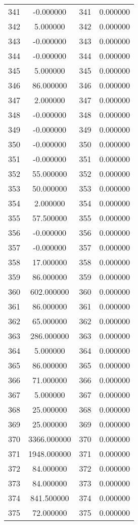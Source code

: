 \documentclass[12pt]{article}
\begin{document}
\begin{longtable}{@{}cccc@{}}
341 & -0.000000 & 341 & 0.000000 \\
342 & 5.000000 & 342 & 0.000000 \\
343 & -0.000000 & 343 & 0.000000 \\
344 & -0.000000 & 344 & 0.000000 \\
345 & 5.000000 & 345 & 0.000000 \\
346 & 86.000000 & 346 & 0.000000 \\
347 & 2.000000 & 347 & 0.000000 \\
348 & -0.000000 & 348 & 0.000000 \\
349 & -0.000000 & 349 & 0.000000 \\
350 & -0.000000 & 350 & 0.000000 \\
351 & -0.000000 & 351 & 0.000000 \\
352 & 55.000000 & 352 & 0.000000 \\
353 & 50.000000 & 353 & 0.000000 \\
354 & 2.000000 & 354 & 0.000000 \\
355 & 57.500000 & 355 & 0.000000 \\
356 & -0.000000 & 356 & 0.000000 \\
357 & -0.000000 & 357 & 0.000000 \\
358 & 17.000000 & 358 & 0.000000 \\
359 & 86.000000 & 359 & 0.000000 \\
360 & 602.000000 & 360 & 0.000000 \\
361 & 86.000000 & 361 & 0.000000 \\
362 & 65.000000 & 362 & 0.000000 \\
363 & 286.000000 & 363 & 0.000000 \\
364 & 5.000000 & 364 & 0.000000 \\
365 & 86.000000 & 365 & 0.000000 \\
366 & 71.000000 & 366 & 0.000000 \\
367 & 5.000000 & 367 & 0.000000 \\
368 & 25.000000 & 368 & 0.000000 \\
369 & 25.000000 & 369 & 0.000000 \\
370 & 3366.000000 & 370 & 0.000000 \\
371 & 1948.000000 & 371 & 0.000000 \\
372 & 84.000000 & 372 & 0.000000 \\
373 & 84.000000 & 373 & 0.000000 \\
374 & 841.500000 & 374 & 0.000000 \\
375 & 72.000000 & 375 & 0.000000 \\

\end{longtable}
\end{document}
